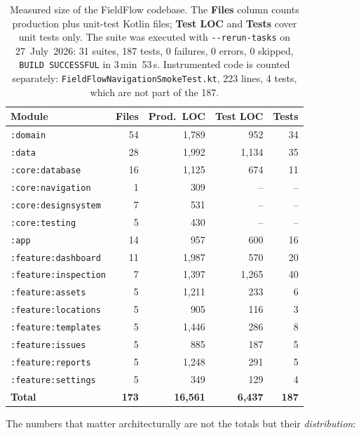 \documentclass[11pt,a4paper]{article}
\newcommand{\mdl}[1]{\texttt{#1}}
\newcommand{\file}[1]{{\small\texttt{#1}}}
\begin{document}
\begin{table}[H]
\centering
\small
\begin{tabular}{@{}l r r r r@{}}
\toprule
\textbf{Module} & \textbf{Files} & \textbf{Prod.\ LOC} & \textbf{Test LOC} & \textbf{Tests} \\
\midrule
\mdl{:domain}              & 54  & 1{,}789 & 952   & 34 \\
\mdl{:data}                & 28  & 1{,}992 & 1{,}134 & 35 \\
\mdl{:core:database}       & 16  & 1{,}125 & 674   & 11 \\
\mdl{:core:navigation}     & 1   & 309     & --    & -- \\
\mdl{:core:designsystem}   & 7   & 531     & --    & -- \\
\mdl{:core:testing}        & 5   & 430     & --    & -- \\
\mdl{:app}                 & 14  & 957     & 600   & 16 \\
\mdl{:feature:dashboard}   & 11  & 1{,}987 & 570   & 20 \\
\mdl{:feature:inspection}  & 7   & 1{,}397 & 1{,}265 & 40 \\
\mdl{:feature:assets}      & 5   & 1{,}211 & 233   & 6  \\
\mdl{:feature:locations}   & 5   & 905     & 116   & 3  \\
\mdl{:feature:templates}   & 5   & 1{,}446 & 286   & 8  \\
\mdl{:feature:issues}      & 5   & 885     & 187   & 5  \\
\mdl{:feature:reports}     & 5   & 1{,}248 & 291   & 5  \\
\mdl{:feature:settings}    & 5   & 349     & 129   & 4  \\
\midrule
\textbf{Total} & \textbf{173} & \textbf{16{,}561} & \textbf{6{,}437} & \textbf{187} \\
\bottomrule
\end{tabular}
\caption{Measured size of the FieldFlow codebase. The \textbf{Files} column
counts production plus unit-test Kotlin files; \textbf{Test LOC} and
\textbf{Tests} cover unit tests only. The suite was executed with
\texttt{-{}-rerun-tasks} on 27~July~2026: 31 suites, 187 tests, 0 failures,
0 errors, 0 skipped, \texttt{BUILD SUCCESSFUL} in 3\,min~53\,s. Instrumented
code is counted separately: \file{FieldFlowNavigationSmokeTest.kt}, 223 lines,
4 tests, which are not part of the 187.}
\label{tab:metrics}
\end{table}

The numbers that matter architecturally are not the totals but their
\emph{distribution}:
\end{document}
